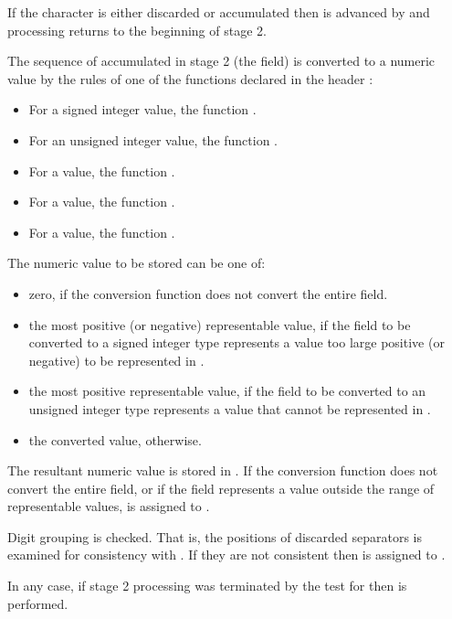 \begin{itemdescr}
\begin{description}
If the character is either discarded or accumulated then 
is advanced by
and processing returns to the beginning of stage 2.

The sequence of  accumulated in stage 2 (the field) is converted to a numeric value by the rules of one of the functions declared in the header :

\begin{itemize}
\item For a signed integer value, the function .

\item For an unsigned integer value, the function .

\item For a  value, the function .

\item For a  value, the function .

\item For a  value, the function .
\end{itemize}

The numeric value to be stored can be one of:
\begin{itemize}
\item zero, if the conversion function does not convert the entire field.

\item the most positive (or negative) representable value,
if the field to be converted to a signed integer type represents a value
too large positive (or negative) to be represented in .

\item the most positive representable value,
if the field to be converted to an unsigned integer type represents a value
that cannot be represented in .

\item the converted value, otherwise.
\end{itemize}

The resultant numeric value is stored in .
If the conversion function does not convert the entire field, or
if the field represents a value outside the range of representable values,
 is assigned to .

\end{description}

\pnum
Digit grouping is checked.
That is, the positions of discarded
separators is examined for consistency with
.
If they are not consistent then
is assigned to .

\pnum
In any case, if stage 2 processing was terminated by the test for
then
is performed.
\end{itemdescr}

